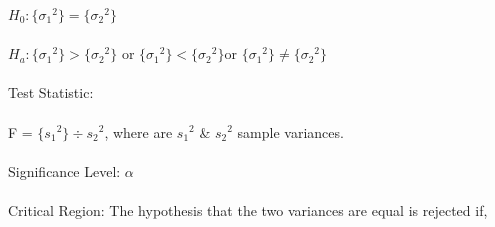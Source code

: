 \documentclass[12pt,a4paper]{report}
\begin{document}
$H_0 : \lbrace {\sigma_ 1}^2 \rbrace = \lbrace {\sigma _2}^2 \rbrace $\\\\
$H_a : \lbrace {\sigma _1}^2 \rbrace > \lbrace {\sigma _2}^2 \rbrace $ or $\lbrace {\sigma _1}^2 \rbrace  < \lbrace {\sigma _2}^2 \rbrace $or $\lbrace {\sigma _1}^2 \rbrace \neq \lbrace {\sigma _2}^2 \rbrace $\\
\\
Test Statistic:\\\\
F = $\lbrace {s_1}^2 \rbrace \div {s_2}^2$, where are ${s_1}^2$ \& ${s_2}^2$ sample variances.\\\\
Significance Level: $\alpha$ \\\\
Critical Region: The hypothesis that the two variances are equal is rejected if,\\
\end{document}
